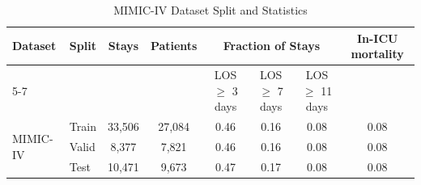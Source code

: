 \begin{table}[H]
\centering
\caption{MIMIC-IV Dataset Split and Statistics}
\label{tab:mimic-dataset-split}
\begin{tabular}{|l|l|c|c|c|c|c|c|}
\hline
\multirow{2}{*}{Dataset} & \multirow{2}{*}{Split} & \multirow{2}{*}{Stays} & \multirow{2}{*}{Patients} & \multicolumn{3}{c|}{Fraction of Stays} & \multirow{2}{*}{In-ICU mortality}\\ \cline{5-7}
 &  &  &  & LOS $\geq$ 3 days & LOS $\geq$ 7 days & LOS $\geq$ 11 days & \\ \hline
\multirow{3}{*}{MIMIC-IV} & Train & 33,506 & 27,084 & 0.46 & 0.16 & 0.08 &0.08 \\ \cline{2-8}
 & Valid & 8,377 & 7,821 & 0.46 & 0.16 & 0.08 & 0.08\\ \cline{2-8}
 & Test & 10,471 & 9,673 & 0.47 & 0.17 & 0.08 & 0.08 \\ \hline
\end{tabular}
\end{table}